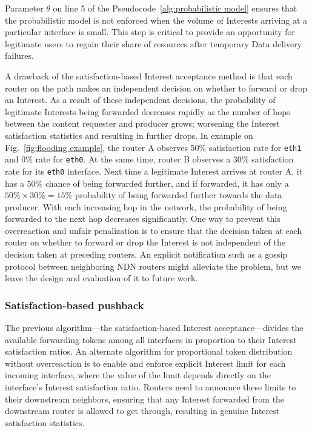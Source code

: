 Parameter $\theta$ on line 5 of the Pseudocode~\ref{alg:probabilistic model} ensures that the probabilistic model is not enforced when the volume of Interests arriving at a particular interface is small. This step is critical to provide an opportunity for legitimate users to regain their share of resources after temporary Data delivery failures.

A drawback of the satisfaction-based Interest acceptance method is that each router on the path makes an independent decision on whether to forward or drop an Interest. 
As a result of these independent decisions,  the probability of legitimate Interests being forwarded decreases rapidly as the number of hops between the content requester and producer grows; worsening the Interest satisfaction statistics and resulting in further drops.
In example on Fig.~\ref{fig:flooding example}, the router A observes 50\% satisfaction rate for \texttt{eth1} and 0\% rate for \texttt{eth0}. 
At the same time, router B observes a 30\% satisfaction rate for its \texttt{eth0} interface.
Next time a legitimate Interest arrives at router A, it has a 50\% chance of being forwarded further, and if forwarded, it has only a $50\% \times 30\% = 15\%$ probability of being forwarded further towards the data producer. With each increasing hop in the network, the probability of being forwarded to the next hop decreases significantly. 
One way to prevent this overreaction and unfair penalization is to ensure that the decision taken at each router on whether to forward or drop the Interest is not independent of the decision taken at preceding routers. An explicit notification such as a gossip protocol between neighboring NDN routers might alleviate the problem, but we leave the design and evaluation of it to future work.


\subsubsection{\textbf{Satisfaction-based pushback}}
\label{sec:dynamic limits}


The previous algorithm---the satisfaction-based Interest acceptance---divides the available forwarding tokens among all interfaces in proportion to their Interest satisfaction ratios.
An alternate algorithm for proportional token distribution without overreaction is to enable and enforce explicit Interest limit for each incoming interface, where the value of the limit depends directly on the interface's Interest satisfaction ratio.
Routers need to announce these limits to their downstream neighbors, ensuring that any Interest forwarded from the downstream router is allowed to get through, resulting in genuine Interest satisfaction statistics.

